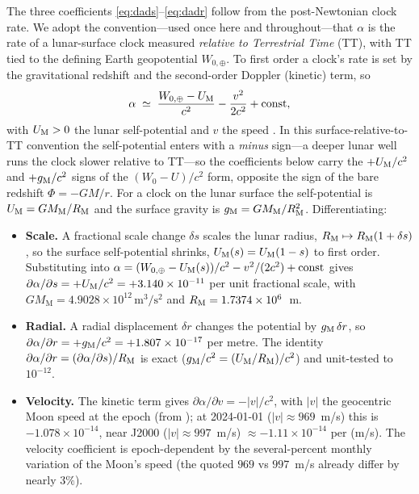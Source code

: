 The three coefficients \eqref{eq:dads}--\eqref{eq:dadr} follow from the post-Newtonian clock
rate. We adopt the convention---used once here and throughout---that $\alpha$ is the rate of
a lunar-surface clock measured \emph{relative to Terrestrial Time} (TT), with TT tied to the
defining Earth geopotential $W_{0,\oplus}$. To first order a clock's rate is set by the
gravitational redshift and the second-order Doppler (kinetic) term, so
\begin{equation}
  \alpha \;\simeq\; \frac{W_{0,\oplus}-U_{\mathrm{M}}}{c^2}-\frac{v^2}{2c^2}+\text{const},
  \label{eq:rate}
\end{equation}
with $U_{\mathrm{M}}>0$ the lunar self-potential and $v$ the speed
\citep{soffel2003iau,mueller2018clocks}. In this surface-relative-to-TT convention the
self-potential enters with a \emph{minus} sign---a deeper lunar well runs the clock slower
relative to TT---so the coefficients below carry the $+U_{\mathrm{M}}/c^2$ and $+g_{\mathrm{M}}/c^2$ signs of
the $(W_0-U)/c^2$ form, opposite the sign of the bare redshift $\Phi=-GM/r$. For a clock on
the lunar surface the self-potential is $U_{\mathrm{M}}=GM_{\mathrm{M}}/R_{\mathrm{M}}$ and the surface
gravity is $g_{\mathrm{M}}=GM_{\mathrm{M}}/R_{\mathrm{M}}^{2}$. Differentiating:
\begin{itemize}
  \item \textbf{Scale.} A fractional scale change $\delta s$ scales the lunar radius,
  $R_{\mathrm{M}}\mapsto R_{\mathrm{M}}(1+\delta s)$, so the surface self-potential shrinks,
  $U_{\mathrm{M}}(s)=U_{\mathrm{M}}(1-s)$ to first order. Substituting into
  $\alpha=(W_{0,\oplus}-U_{\mathrm{M}}(s))/c^2-v^2/(2c^2)+\text{const}$ gives
  $\partial\alpha/\partial s=+U_{\mathrm{M}}/c^2=+3.140\times10^{-11}$ per unit fractional scale, with
  $GM_{\mathrm{M}}=4.9028\times10^{12}\,\mathrm{m^3/s^2}$ and
  $R_{\mathrm{M}}=1.7374\times10^{6}$~m.
  \item \textbf{Radial.} A radial displacement $\delta r$ changes the potential by
  $g_{\mathrm{M}}\,\delta r$, so $\partial\alpha/\partial r=+g_{\mathrm{M}}/c^2=+1.807\times10^{-17}$ per
  metre. The identity $\partial\alpha/\partial r=(\partial\alpha/\partial s)/R_{\mathrm{M}}$ is exact
  ($g_{\mathrm{M}}/c^2=(U_{\mathrm{M}}/R_{\mathrm{M}})/c^2$) and unit-tested to $10^{-12}$.
  \item \textbf{Velocity.} The kinetic term gives $\partial\alpha/\partial v=-|v|/c^2$, with
  $|v|$ the geocentric Moon speed at the epoch (from ); at 2024-01-01
  ($|v|\approx969$~m/s) this is $-1.078\times10^{-14}$, near J2000 ($|v|\approx997$~m/s)
  $\approx-1.11\times10^{-14}$ per (m/s). The velocity coefficient is epoch-dependent by the
  several-percent monthly variation of the Moon's speed (the quoted $969$ vs $997$~m/s
  already differ by nearly $3\%$).
\end{itemize}
